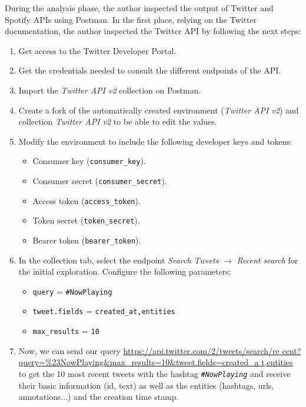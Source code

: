 \nonzeroparskip During the analysis phase, the author inspected the output of Twitter and Spotify APIs using Postman. In the first place, relying on the Twitter documentation, the author inspected the Twitter API by following the next steps:
\begin{enumerate}
	\item Get access to the Twitter Developer Portal.
	\item Get the credentials needed to consult the different endpoints of the API.
	\item Import the \textit{Twitter API v2} collection on Postman.
	\item Create a fork of the automatically created environment (\textit{Twitter API v2}) and collection \textit{Twitter API v2} to be able to edit the values.
	\item Modify the environment to include the following developer keys and tokens:
	\begin{itemize}
		\item Consumer key (\texttt{consumer\_key}).
		\item Consumer secret (\texttt{consumer\_secret}).
		\item Access token (\texttt{access\_token}).
		\item Token secret (\texttt{token\_secret}).
		\item Bearer token (\texttt{bearer\_token}).
	\end{itemize}
	\item In the collection tab, select the endpoint \textit{Search Tweets} $\longrightarrow$ \textit{Recent search} for the initial exploration. Configure the following parameters:
	\begin{itemize}
		\item \texttt{query} = \texttt{\#NowPlaying}
		\item \texttt{tweet.fields} = \texttt{created\_at,entities}
		\item \texttt{max\_results} = \texttt{10}
	\end{itemize}
	\item Now, we can send our query \url{https://api.twitter.com/2/tweets/search/re cent?query=\%23NowPlaying\&max\_results=10\&tweet.fields=created\_a t,entities} to get the 10 most recent tweets with the hashtag \texttt{\textit{\#NowPlaying}} and receive their basic information (id, text) as well as the entities (hashtags, urls, annotations...) and the creation time stamp.
\end{enumerate}

